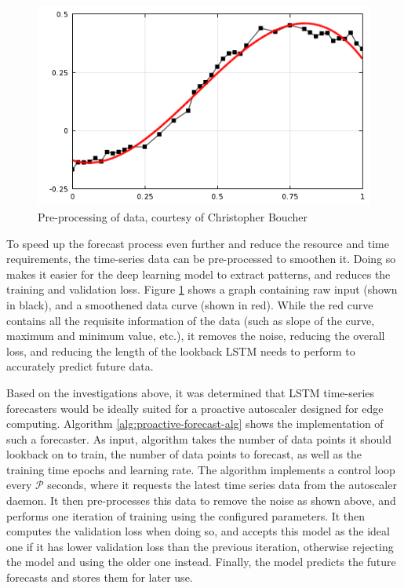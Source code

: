 \begin{figure}[htb]
    \centering
    \caption{Pre-processing of data, courtesy of Christopher Boucher \cite{comsolcurvefitting}}
    \label{fig:data-pre-process}
    \includegraphics[width=0.6\linewidth]{Figures/Data-Pre-Processing.png}
\end{figure}

To speed up the forecast process even further and reduce the resource and time requirements, the time-series data can be pre-processed to smoothen it. Doing so makes it easier for the deep learning model to extract patterns, and reduces the training and validation loss. Figure \ref{fig:data-pre-process} shows a graph containing raw input (shown in black), and a smoothened data curve (shown in red). While the red curve contains all the requisite information of the data (such as slope of the curve, maximum and minimum value, etc.), it removes the noise, reducing the overall loss, and reducing the length of the lookback LSTM needs to perform to accurately predict future data.\par

Based on the investigations above, it was determined that LSTM time-series forecasters would be ideally suited for a proactive autoscaler designed for edge computing. Algorithm \ref{alg:proactive-forecast-alg} shows the implementation of such a forecaster. As input, algorithm takes the number of data points it should lookback on to train, the number of data points to forecast, as well as the training time epochs and learning rate. The algorithm implements a control loop every $\mathcal{P}$ seconds, where it requests the latest time series data from the autoscaler daemon. It then pre-processes this data to remove the noise as shown above, and performs one iteration of training using the configured parameters. It then computes the validation loss when doing so, and accepts this model as the ideal one if it has lower validation loss than the previous iteration, otherwise rejecting the model and using the older one instead. Finally, the model predicts the future forecasts and stores them for later use.\par

